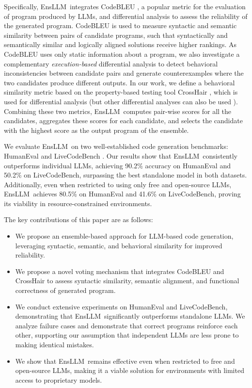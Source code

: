 \documentclass{article}
\newcommand{\tool}{EnsLLM}
\begin{document}
Specifically, \tool\ integrates CodeBLEU \cite{codebleu}, a popular metric for the evaluation of program produced by LLMs,  and differential analysis 
to assess the reliability of the generated program. CodeBLEU 
is used to measure syntactic and semantic similarity between pairs of candidate programs, such that syntactically and semantically similar and logically aligned solutions receive higher rankings. As CodeBLEU uses only static information about a program, we also investigate a complementary {\em execution-based} differential analysis to detect behavioral inconsistencies between candidate pairs and generate counterexamples where the two candidates produce different outputs. In our work, we define a behavioral similarity metric based on the property-based testing tool CrossHair \cite{crosshair}, which is used for differential analysis (but other differential analyses can also be used \cite{hydiff, lahiri2010differential}). Combining these two metrics, \tool\ computes pair-wise scores for all the candidates, aggregates these scores for each candidate, and selects the candidate with the highest score as the output program of the ensemble.

We evaluate \tool\ on two well-established code generation benchmarks: HumanEval \cite{humaneval} and LiveCodeBench \cite{livecodebench}. Our results show that \tool\ consistently outperforms individual LLMs, achieving 90.2\% accuracy on HumanEval and 50.2\% on LiveCodeBench, surpassing the best standalone model in both datasets. 
Additionally, even when restricted to using only free and open-source LLMs, \tool\ achieves 80.5\% on HumanEval and 41.6\% on LiveCodeBench, proving its viability in resource-constrained environments.

The key contributions of this paper are as follows:
\begin{itemize}
    \item We propose an ensemble-based approach for LLM-based code generation, leveraging syntactic, semantic, and behavioral similarity for improved reliability. 
    \item We propose a novel voting mechanism that integrates CodeBLEU and CrossHair to assess syntactic similarity, semantic alignment, and functional correctness of generated program.
    \item We conduct extensive experiments on HumanEval and LiveCodeBench, demonstrating that \tool\ significantly outperforms standalone LLMs. We analyze failure cases and demonstrate that correct programs reinforce each other, supporting our assumption that independent LLMs are less prone to making identical mistakes.
    \item We show that \tool\ remains effective even when restricted to free and open-source LLMs, making it a viable solution for environments with limited access to proprietary models.
\end{itemize}
\end{document}
